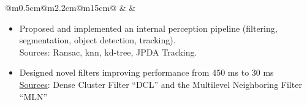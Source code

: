 \documentclass[10pt,a4paper]{article}
\begin{document}
\vspace{1em}                       
\begin{tabular}{@{}m{0.5cm}@{\hspace{0.5em}}m{2.2cm}@{\hspace{0.5em}}m{15cm}@{}}
   & 
  \raisebox{1.8em}{\begin{minipage}[t]{\linewidth}
  \centering
    \textcolor{blocktitle1_color}{Sep. 21}\\
    \textcolor{blocktitle1_color}{Sep. 22}
  \end{minipage} 
  } &
\end{tabular}


\vspace{-1em}
\begin{itemize}[leftmargin=*]
  \item Proposed and implemented an internal perception pipeline (filtering, segmentation, object detection, tracking).\\ {\fontsize{10pt}{10pt}\selectfont\textcolor{blocktext2_color}{Sources: Ransac, knn, kd-tree, JPDA Tracking}}. 
  \item Designed novel filters improving performance from 450 ms to 30 ms 
  \\ {\fontsize{10pt}{10pt}\selectfont\textcolor{blocktext2_color}{{\fontsize{10pt}{10pt}\selectfont\textcolor{blocktext2_color}{\href{https://amr-aboughazala.super.site/data-analysis}{Sources}}}: Dense Cluster Filter “DCL” and the Multilevel Neighboring Filter “MLN”}}

\end{itemize}
\end{document}
